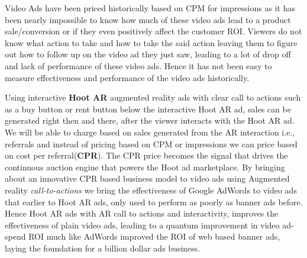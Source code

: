 Video Ads have been priced historically based on CPM for impressions as it has been nearly impossible to know how much of these video ads lead to a product sale/conversion or if they even positively affect the customer ROI. Viewers do not know what action to take and how to take the said action leaving them to figure out how to follow up on the video ad they just saw, leading to a lot of drop off and lack of performance of these video ads. Hence it has not been easy  to measure effectiveness and performance of the video ads historically.

Using interactive \textbf{Hoot AR} augmented reality  ads with clear
call to actions such as a buy button or rent button below the
interactive Hoot AR ad, sales can be generated right then and there,
after the viewer interacts with the Hoot AR ad. We will be able to
charge based on sales generated from the AR interaction i.e.,
referrals and instead of pricing based on CPM or impressions we can
price based on  cost per referral(\textbf{CPR}). The CPR price becomes
the signal that drives the continuous auction engine that powers the
Hoot ad marketplace. By bringing about an innovative CPR based
business model to video ads using Augmented reality
\emph{call-to-actions} we bring the effectiveness of Google AdWords to
video ads that earlier to Hoot AR ads, only used to perform as poorly as banner ads
before. Hence Hoot AR ads with AR call to actions and interactivity, improves the effectiveness of plain video
ads, leading to a quantum improvement in video ad-spend ROI much like
AdWords improved the ROI of web based banner ads, laying the
foundation for a billion dollar ads business.
